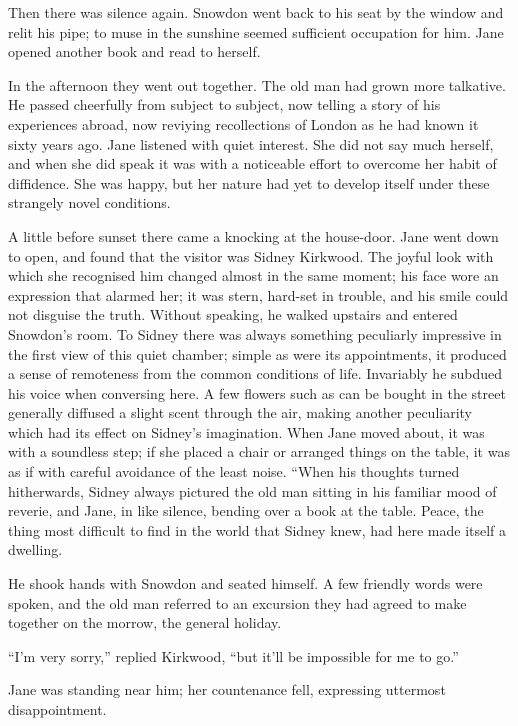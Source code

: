 Then there was silence again. Snowdon went back to his seat by the
window and relit his pipe; to muse in the sunshine seemed sufficient
occupation for him. Jane opened another book and read to herself.

In the afternoon they went out together.
{\protect\hypertarget{243}{}{}}The old man had grown more talkative. He
passed cheerfully from subject to subject, now telling a story of his
experiences abroad, now reviying recollections of London as he had known
it sixty years ago. Jane listened with quiet interest. She did not say
much herself, and when she did speak it was with a noticeable effort to
overcome her habit of diffidence. She was happy, but her nature had yet
to develop itself under these strangely novel conditions.

A little before sunset there came a knocking at the house-door. Jane
went down to open, and found that the visitor was Sidney Kirkwood. The
joyful look with which she recognised him changed almost in the same
moment; his face wore an expression that alarmed her; it was stern,
hard-set in trouble, and his smile could not disguise the truth. Without
speaking, he walked upstairs and entered Snowdon's room. To Sidney there
was always something peculiarly impressive in the first view of this
quiet chamber; simple as were its appointments, it produced a sense
{\protect\hypertarget{244}{}{}}of remoteness from the common conditions
of life. Invariably he subdued his voice when conversing here. A few
flowers such as can be bought in the street generally diffused a slight
scent through the air, making another peculiarity which had its effect
on Sidney's imagination. When Jane moved about, it was with a soundless
step; if she placed a chair or arranged things on the table, it was as
if with careful avoidance of the least noise. ``When his thoughts turned
hitherwards, Sidney always pictured the old man sitting in his familiar
mood of reverie, and Jane, in like silence, bending over a book at the
table. Peace, the thing most difficult to find in the world that Sidney
knew, had here made itself a dwelling.

He shook hands with Snowdon and seated himself. A few friendly words
were spoken, and the old man referred to an excursion they had agreed to
make together on the morrow, the general holiday.

``I'm very sorry,'' replied Kirkwood, ``but it'll be impossible for me
to go.''

{\protect\hypertarget{245}{}{}}Jane was standing near him; her
countenance fell, expressing uttermost disappointment.

